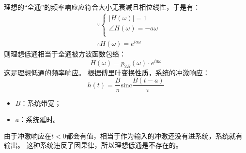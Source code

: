 理想的“全通”的频率响应应符合大小无衰减且相位线性，于是有：
\begin{align*}
&\because \begin{cases}
	\left| H\left( \omega \right) \right|=1\\
	\angle H\left( \omega \right) =-a\omega\\
\end{cases} \\
&\therefore H\left( \omega \right) =e^{ia\omega}
\end{align*}
则理想低通相当于全通被方波函数包络：
\[
H\left( \omega \right) =p_{2B}\left( \omega \right) \cdot e^{ia\omega}
\]
这是理想低通的频率响应。
根据傅里叶变换性质，系统的冲激响应：
\[
h\left( t \right) =\frac{B}{\pi}\mathrm{sinc}\frac{B\left( t-a \right)}{\pi}
\]
\begin{itemize}
    \item $B$：系统带宽；
    \item $a$：系统延时。
\end{itemize}
由于冲激响应在$t<0$都会有值，相当于作为输入的冲激还没有进系统，系统就有输出。
这种系统违反了因果律，所以理想低通是不存在的。




